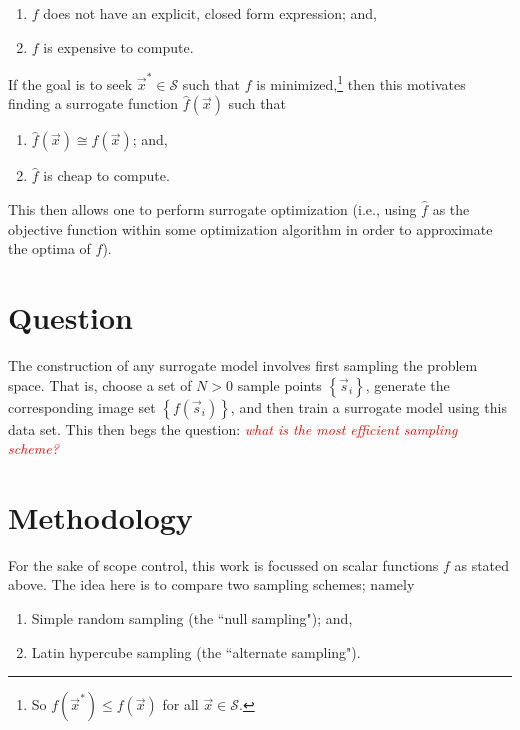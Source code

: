 \documentclass[12pt, letterpaper]{report}
\theoremstyle{definition}
\begin{document}
\begin{enumerate}
	\item $f$ does not have an explicit, closed form expression; and,
	\item $f$ is expensive to compute.
\end{enumerate}

\noindent If the goal is to seek $\vec{x}^*\in\mathcal{S}$ such that $f$ is minimized,\footnote{So $f(\vec{x}^*)\leq f(\vec{x})$ for all $\vec{x}\in\mathcal{S}$.} then this motivates finding a surrogate function $\widehat{f}(\vec{x})$ such that

\begin{enumerate}
	\item $\widehat{f}(\vec{x})\cong f(\vec{x})$; and,
	\item $\widehat{f}$ is cheap to compute.
\end{enumerate}

\noindent This then allows one to perform surrogate optimization (i.e., using $\widehat{f}$ as the objective function within some optimization algorithm in order to approximate the optima of $f$).

\section*{Question}

The construction of any surrogate model involves first sampling the problem space. That is, choose a set of $N>0$ sample points $\left\{\vec{s}_i\right\}$, generate the corresponding image set $\left\{f(\vec{s}_i)\right\}$, and then train a surrogate model using this data set. This then begs the question: \textcolor{red}{\textit{what is the most efficient sampling scheme?}}\par

\section*{Methodology}

For the sake of scope control, this work is focussed on scalar functions $f$ as stated above. The idea here is to compare two sampling schemes; namely

\begin{enumerate}
	\item Simple random sampling (the ``null sampling"); and,
	\item Latin hypercube sampling (the ``alternate sampling").
\end{enumerate} 
\end{document}
